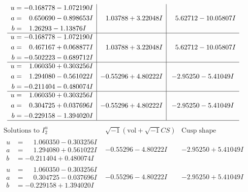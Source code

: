 \documentclass[1p]{elsarticle_modified}
\theoremstyle{definition}
\newcommand{\I}{\sqrt{-1}}
\begin{document}
$$\begin{array}{c|c|c}
\begin{aligned}
u &= -0.168778 - 1.072190 I \\
a &= \phantom{-}0.650690 - 0.898653 I \\
b &= \phantom{-}1.26293 - 1.13876 I\end{aligned}
 & \phantom{-}1.03788 + 3.22048 I & \phantom{-}5.62712 - 10.05807 I \\ \hline\begin{aligned}
u &= -0.168778 - 1.072190 I \\
a &= \phantom{-}0.467167 + 0.068877 I \\
b &= -0.502223 - 0.689712 I\end{aligned}
 & \phantom{-}1.03788 + 3.22048 I & \phantom{-}5.62712 - 10.05807 I \\ \hline\begin{aligned}
u &= \phantom{-}1.060350 + 0.303256 I \\
a &= \phantom{-}1.294080 - 0.561022 I \\
b &= -0.211404 - 0.480074 I\end{aligned}
 & -0.55296 + 4.80222 I & -2.95250 - 5.41049 I \\ \hline\begin{aligned}
u &= \phantom{-}1.060350 + 0.303256 I \\
a &= \phantom{-}0.304725 + 0.037696 I \\
b &= -0.229158 - 1.394020 I\end{aligned}
 & -0.55296 + 4.80222 I & -2.95250 - 5.41049 I\\
 \hline 
 \end{array}$$\newpage$$\begin{array}{c|c|c}  
\text{Solutions to }I^u_{2}& \I (\text{vol} + \sqrt{-1}CS) & \text{Cusp shape}\\
 \hline 
\begin{aligned}
u &= \phantom{-}1.060350 - 0.303256 I \\
a &= \phantom{-}1.294080 + 0.561022 I \\
b &= -0.211404 + 0.480074 I\end{aligned}
 & -0.55296 - 4.80222 I & -2.95250 + 5.41049 I \\ \hline\begin{aligned}
u &= \phantom{-}1.060350 - 0.303256 I \\
a &= \phantom{-}0.304725 - 0.037696 I \\
b &= -0.229158 + 1.394020 I\end{aligned}
 & -0.55296 - 4.80222 I & -2.95250 + 5.41049 I \\ \hline\begin{aligned}

\end{aligned}
\end{array}$$
\end{document}
